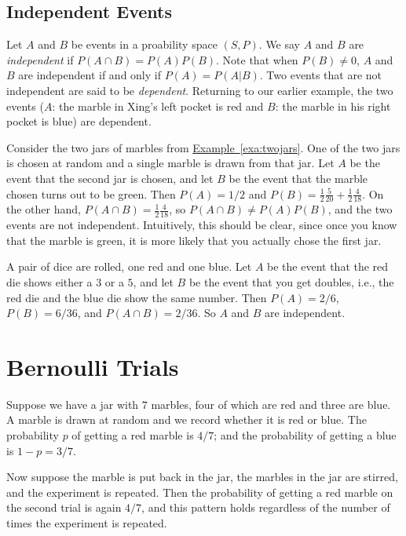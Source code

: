 \subsection{Independent Events}

Let $A$ and $B$ be events in a proability space $(S,P)$.  We say $A$
and $B$ are \textit{independent} if $P(A\cap B)=P(A)P(B)$.  Note that
when $P(B)\neq 0$, $A$ and $B$ are independent if and only if
$P(A)=P(A|B)$. Two events that are not independent are said to be
\emph{dependent}. Returning to our earlier example, the two events
($A$: the marble in Xing's left pocket is red and $B$: the marble in
his right pocket is blue) are dependent.

\begin{example}
  Consider the two jars of marbles from
  \hyperref[exa:twojars]{Example~\ref*{exa:twojars}}.  One of the two
  jars is chosen at random and a single marble is drawn from that jar.
  Let $A$ be the event that the second jar is chosen, and let $B$ be
  the event that the marble chosen turns out to be green.  Then
  $P(A)=1/2$ and $P(B)=\frac{1}{2}\frac{5}{20}+
  \frac{1}{2}\frac{4}{18}$.  On the other hand, $P(A\cap
  B)=\frac{1}{2} \frac{4}{18}$, so $P(A\cap B)\neq P(A)P(B)$, and the
  two events are not independent.  Intuitively, this should be clear,
  since once you know that the marble is green, it is more likely that
  you actually chose the first jar.
\end{example}

\begin{example}\label{exa:twodie}
A pair of dice are rolled, one red and one blue. Let $A$ be the event
that the red die shows either a $3$ or a $5$, and let $B$ be the event that you
get doubles, i.e., the red die and the blue die show the same number.
Then $P(A)=2/6$, $P(B)=6/36$, and $P(A\cap B) = 2/36$.  So $A$ and $B$
are independent. 
\end{example}

\section{Bernoulli Trials}

Suppose we have a jar with $7$ marbles, four of which are red
and three are blue.  A marble is drawn at random and we record whether it
is red or blue.  The probability $p$ of getting a red marble
is $4/7$; and the probability of getting a blue is $1-p=3/7$.

Now suppose the marble is put back in the jar, the marbles in the
jar are stirred, and the experiment is repeated.  Then the probability
of getting a red marble on the second trial is again $4/7$, 
and this pattern holds regardless of the number of times the experiment 
is repeated.  

